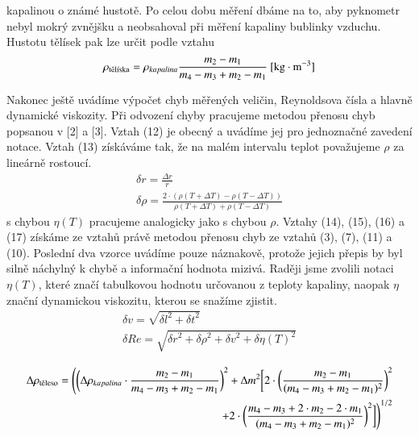 \documentclass[a4paper]{article}
\begin{document}
kapalinou o známé hustotě. Po celou dobu měření dbáme na to, aby pyknometr nebyl mokrý zvnějšku a neobsahoval při měření kapaliny bublinky vzduchu. Hustotu tělísek pak lze určit podle vztahu
\begin{align}
\rho_{\textnormal{tělíska}} = \rho_{kapalina} \frac{m_{2} - m_{1}}{m_{4} - m_{3} + m_{2} - m_{1}} \: \mathrm{[kg \cdot m^{-3}}]
\end{align}
\par Nakonec ještě uvádíme výpočet chyb měřených veličin, Reynoldsova čísla a hlavně dynamické viskozity. Při odvození chyby pracujeme metodou přenosu chyb popsanou v [2] a [3]. Vztah (12) je obecný a uvádíme jej pro jednoznačné zavedení notace. Vztah (13) získáváme tak, že na malém intervalu teplot považujeme $\rho$ za lineárně rostoucí.  
\begin{align}
\delta r = \frac{\Delta r}{r}\\
\delta \rho = \frac{2 \cdot (\rho(T+\Delta T) - \rho(T-\Delta T))}{\rho(T+\Delta T) + \rho(T-\Delta T)}
\end{align}
s chybou $\eta(T)$ pracujeme analogicky jako s chybou $\rho$. Vztahy (14), (15), (16) a (17) získáme ze vztahů právě metodou přenosu chyb ze vztahů (3), (7), (11) a (10). Poslední dva vzorce uvádíme pouze náznakově, protože jejich přepis by byl silně náchylný k chybě a informační hodnota mizivá. Raději jsme zvolili notaci $\eta(T)$, které značí tabulkovou hodnotu určovanou z teploty kapaliny, naopak $\eta$ znační dynamickou viskozitu, kterou se snažíme zjistit.
\begin{align}
\delta v = \sqrt{{\delta l}^{2} + {\delta t}^{2}}\\
\delta Re = \sqrt{{\delta r}^{2} + {\delta \rho}^{2} + {\delta v}^{2} + {\delta \eta(T)}^{2}}
\end{align}
\newpage
\begin{align}
\end{align}
\begin{eqnarray*}
\Delta \rho_{\textnormal{těleso}} = \Bigg(\bigg({\Delta \rho_{kapalina}} \cdot \frac{m_{2} - m_{1}}{m_{4} - m_{3} + m_{2} - m_{1}} \bigg)^{2} + {\Delta m}^{2} \bigg[ 2 \cdot  {\bigg( \frac{m_{2} - m_{1}}{{(m_{4} - m_{3} + m_{2} - m_{1})^{2}}} \bigg)^{2}} \\
+ 2 \cdot {\bigg( \frac{m_{4} - m_{3} + 2 \cdot m_{2} - 2 \cdot m_{1}}{{(m_{4} - m_{3} + m_{2} - m_{1})^{2}}} \bigg)^{2}} \bigg] \Bigg)^{1/2}
\end{eqnarray*}
\begin{align}
\end{align}
\end{document}
